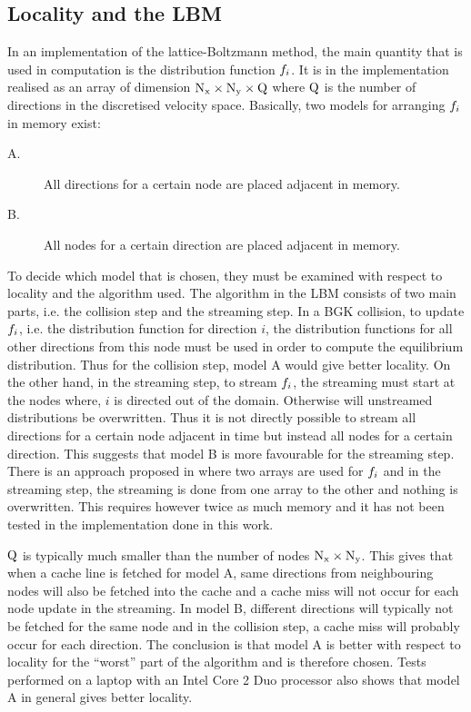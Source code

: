 
\subsection{Locality and the LBM}\label{sec:hpc:loc_lbm}
In an implementation of the lattice-Boltzmann method, the main
quantity that is used in computation is the distribution
function $f_i$. It is in the implementation realised as an array of
dimension $\mathrm{N_x} \times \mathrm{N_y} \times \mathrm{Q}$ where $\mathrm{Q}$ is the number of
directions in the discretised velocity space. Basically, two models
for arranging $f_i$ in memory exist:

\begin{description}
  \item[A.] All directions for a certain node are placed adjacent in
    memory.
  \item[B.] All nodes for a certain direction are placed adjacent in
    memory.
\end{description}

To decide which model that is chosen, they must be examined with
respect to locality and the algorithm used. The algorithm in the LBM
consists of two main parts, i.e. the collision step and the streaming
step. In a BGK collision, to update $f_i$, i.e. the distribution
function for direction $i$, the distribution functions for all other
directions from this node must be used in order to compute the
equilibrium distribution. Thus for the collision step, model A would
give better locality. On the other hand, in the streaming step, to
stream $f_i$, the streaming must start at the nodes where, $i$ is
directed out of the domain. Otherwise will unstreamed distributions be
overwritten. Thus it is not directly possible to stream all directions
for a certain node adjacent in time but instead all nodes for a
certain direction. This suggests that model B is more favourable for
the streaming step. There is an approach proposed in \cite{mikael}
where two arrays are used for $f_i$ and in the streaming step, the
streaming is done from one array to the other and nothing is
overwritten. This requires however twice as much memory and it has not
been tested in the implementation done in this work.

$\mathrm{Q}$ is typically much smaller than the number of nodes $\mathrm{N_x} \times
\mathrm{N_y}$. This gives that when a cache line is fetched for model A, same
directions from neighbouring nodes will also be fetched into the cache
and a cache miss will not occur for each node update in the
streaming. In model B, different directions will typically not be
fetched for the same node and in the collision step, a cache miss will
probably occur for each direction. The conclusion is that model A is
better with respect to locality for the ``worst'' part of the
algorithm and is therefore chosen. Tests performed on a laptop with
an Intel Core 2 Duo processor also shows that model A in general gives
better locality.

